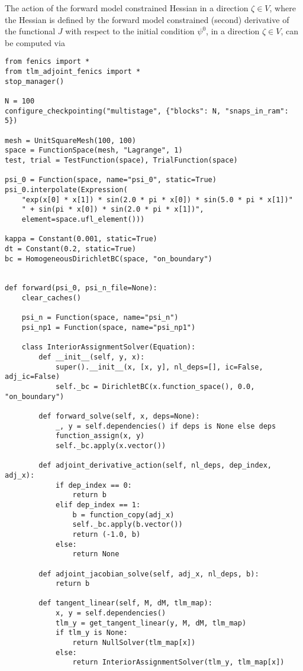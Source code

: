 \documentclass[11pt]{article}
\begin{document}
The action of the forward model constrained Hessian in a direction $\zeta \in
V$, where the Hessian is defined by the forward model constrained (second)
derivative of the functional $J$ with respect to the initial condition
$\psi^0$, in a direction $\zeta \in V$, can be computed via
\begin{lstlisting}
from fenics import *
from tlm_adjoint_fenics import *
stop_manager()

N = 100
configure_checkpointing("multistage", {"blocks": N, "snaps_in_ram": 5})

mesh = UnitSquareMesh(100, 100)
space = FunctionSpace(mesh, "Lagrange", 1)
test, trial = TestFunction(space), TrialFunction(space)

psi_0 = Function(space, name="psi_0", static=True)
psi_0.interpolate(Expression(
    "exp(x[0] * x[1]) * sin(2.0 * pi * x[0]) * sin(5.0 * pi * x[1])"
    " + sin(pi * x[0]) * sin(2.0 * pi * x[1])",
    element=space.ufl_element()))

kappa = Constant(0.001, static=True)
dt = Constant(0.2, static=True)
bc = HomogeneousDirichletBC(space, "on_boundary")


def forward(psi_0, psi_n_file=None):
    clear_caches()

    psi_n = Function(space, name="psi_n")
    psi_np1 = Function(space, name="psi_np1")

    class InteriorAssignmentSolver(Equation):
        def __init__(self, y, x):
            super().__init__(x, [x, y], nl_deps=[], ic=False, adj_ic=False)
            self._bc = DirichletBC(x.function_space(), 0.0, "on_boundary")

        def forward_solve(self, x, deps=None):
            _, y = self.dependencies() if deps is None else deps
            function_assign(x, y)
            self._bc.apply(x.vector())

        def adjoint_derivative_action(self, nl_deps, dep_index, adj_x):
            if dep_index == 0:
                return b
            elif dep_index == 1:
                b = function_copy(adj_x)
                self._bc.apply(b.vector())
                return (-1.0, b)
            else:
                return None

        def adjoint_jacobian_solve(self, adj_x, nl_deps, b):
            return b

        def tangent_linear(self, M, dM, tlm_map):
            x, y = self.dependencies()
            tlm_y = get_tangent_linear(y, M, dM, tlm_map)
            if tlm_y is None:
                return NullSolver(tlm_map[x])
            else:
                return InteriorAssignmentSolver(tlm_y, tlm_map[x])


\end{lstlisting}
\end{document}
